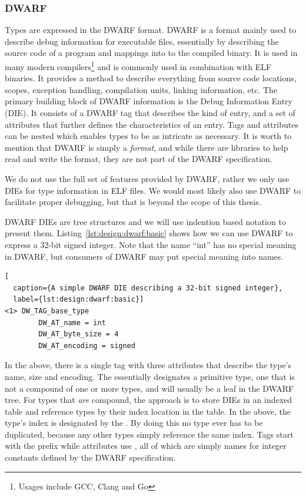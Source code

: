 \subsubsection{DWARF}
\label{sec:design:types:dwarf}

Types are expressed in the DWARF format\cite{dwarf}. DWARF is a format mainly
used to describe debug information for executable files, essentially by
describing the source code of a program and mappings into to the compiled
binary. It is used in many modern compilers\footnote{Usages include GCC, Clang
  and Go} and is commonly used in combination with ELF binaries. It provides a
method to describe everything from source code locations, scopes, exception
handling, compilation units, linking information, etc. The primary building
block of DWARF information is the Debug Information Entry (DIE). It consists of
a DWARF tag that describes the kind of entry, and a set of attributes that
further defines the characteristics of an entry. Tags and attributes can be
nested which enables types to be as intricate as necessary. It is worth to
mention that DWARF is simply a \emph{format}, and while there are libraries to
help read and write the format, they are not part of the DWARF specification.

We do not use the full set of features provided by DWARF, rather we only use
DIEs for type information in ELF files. We would most likely also use DWARF to
facilitate proper debugging, but that is beyond the scope of this thesis.

DWARF DIEs are tree structures and we will use indention based notation to
present them. Listing~\ref{lst:design:dwarf:basic} shows how we can use DWARF to
express a 32-bit signed integer. Note that the name ``int'' has no special
meaning in DWARF, but consumers of DWARF may put special meaning into names.

\begin{lstlisting}[
  caption={A simple DWARF DIE describing a 32-bit signed integer},
  label={lst:design:dwarf:basic}]
<1> DW_TAG_base_type
        DW_AT_name = int
        DW_AT_byte_size = 4
        DW_AT_encoding = signed
\end{lstlisting}

In the above, there is a single tag with three attributes that describe the
type's name, size and encoding. The  essentially
designates a primitive type, one that is not a compound of one or more types,
and will usually be a leaf in the DWARF tree. For types that \emph{are}
compound, the approach is to store DIEs in an indexed table and reference types
by their index location in the table. In the above, the type's index is
designated by the . By doing this no type ever has to be duplicated,
because any other types simply reference the same index. Tags start with the
 prefix while attributes use , all of which are
simply names for integer constants defined by the DWARF specification.

